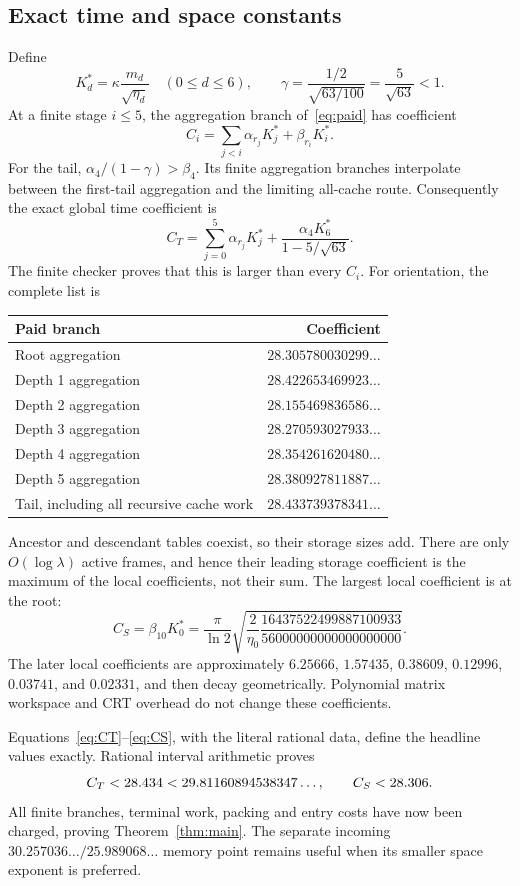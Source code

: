 \subsection{Exact time and space constants}

Define
\[
 K_d^*=\kappa\frac{m_d}{\sqrt{\eta_d}}\quad(0\le d\le6),
 \qquad \gamma=\frac{1/2}{\sqrt{63/100}}=\frac5{\sqrt{63}}<1.
\]
At a finite stage $i\le5$, the aggregation branch of~\eqref{eq:paid}
has coefficient
\[
 C_i=\sum_{j<i}\alpha_{r_j}K_j^*+\beta_{r_i}K_i^*.
\]
For the tail, $\alpha_4/(1-\gamma)>\beta_4$. Its finite aggregation
branches interpolate between the first-tail aggregation and the limiting
all-cache route. Consequently the exact global time coefficient is
\begin{equation}\label{eq:CT}
 \boxed{C_T=\sum_{j=0}^{5}\alpha_{r_j}K_j^*
           +\frac{\alpha_4 K_6^*}{1-5/\sqrt{63}}.}
\end{equation}
The finite checker proves that this is larger than every $C_i$. For
orientation, the complete list is
\begin{center}\small
\begin{tabular}{@{}lr@{}}
\toprule Paid branch & Coefficient\\
\midrule
Root aggregation &$28.305780030299\ldots$\\
Depth 1 aggregation &$28.422653469923\ldots$\\
Depth 2 aggregation &$28.155469836586\ldots$\\
Depth 3 aggregation &$28.270593027933\ldots$\\
Depth 4 aggregation &$28.354261620480\ldots$\\
Depth 5 aggregation &$28.380927811887\ldots$\\
Tail, including all recursive cache work &$28.433739378341\ldots$\\
\bottomrule
\end{tabular}
\end{center}

Ancestor and descendant tables coexist, so their storage sizes add.
There are only $O(\log\lambda)$ active frames, and hence their leading
storage coefficient is the maximum of the local coefficients, not their
sum. The largest local coefficient is at the root:
\begin{equation}\label{eq:CS}
 \boxed{C_S=\beta_{10}K_0^*
 =\frac\pi{\ln2}
  \sqrt{\frac{2}{\eta_0}
       \frac{16437522499887100933}{56000000000000000000}}.}
\end{equation}
The later local coefficients are approximately $6.25666$, $1.57435$,
$0.38609$, $0.12996$, $0.03741$, and $0.02331$, and then decay
geometrically. Polynomial matrix workspace and CRT overhead do not change
these coefficients.

Equations~\eqref{eq:CT}--\eqref{eq:CS}, with the literal rational data,
define the headline values exactly. Rational interval arithmetic proves
\[
 C_T<28.434<29.81160894538347\ldots,\qquad C_S<28.306.
\]
All finite branches, terminal work, packing and entry costs have now been
charged, proving Theorem~\ref{thm:main}. The separate incoming
$30.257036\ldots/25.989068\ldots$ memory point remains useful when its
smaller space exponent is preferred.
